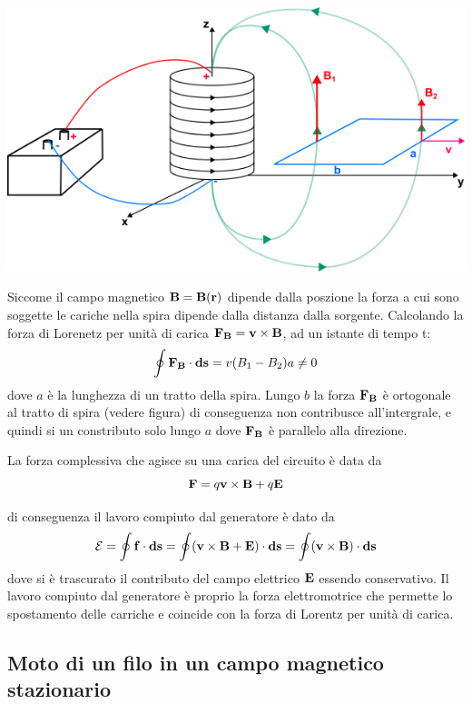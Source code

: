 \begin{center}
	\includegraphics[width = 0.6 \textwidth]{images/generator.png}
\end{center}

Siccome il campo magnetico $\bold{B} = \bold{B}(\bold{r})$ dipende dalla poszione la forza a cui sono soggette le cariche nella spira dipende dalla distanza dalla sorgente. Calcolando la forza di Lorenetz  per unit\`a di carica  $\bold{F_B} = \bold{v} \times \bold{B}$, ad un istante di tempo t:
\begin{equation*}
	\oint \bold{F_B} \cdot \bold{ds} = v(B_1 - B_2)a \neq 0 
\end{equation*}
dove $a$ \`e la lunghezza di un tratto della spira.  Lungo $b$ la forza $\bold{F_B}$ \`e ortogonale al tratto di spira (vedere figura) di conseguenza non contribusce all'intergrale, e quindi si un constributo solo lungo $a$ dove $\bold{F_B}$ \`e parallelo alla direzione.

La forza complessiva che agisce su una carica  del circuito \`e data da 
\begin{equation*}
	\bold{F} = q \bold{v} \times \bold{B} + q\bold{E}
\end{equation*}

di conseguenza il lavoro compiuto dal generatore \`e dato da 
\begin{equation*}
	\mathcal{E} = \oint \bold{f} \cdot \bold{ds} = \oint (\bold{v} \times \bold{B} + \bold{E}) \cdot \bold{ds} = \oint (\bold{v} \times \bold{B}) \cdot \bold{ds}
\end{equation*}
dove si \`e trascurato il contributo del campo elettrico $\bold{E}$ essendo conservativo. Il lavoro compiuto dal generatore \`e  proprio la forza elettromotrice che permette lo spostamento delle carriche e coincide con la forza di Lorentz per unit\`a di carica.

\subsection{Moto di un filo in un campo magnetico stazionario}

